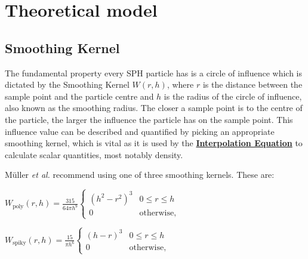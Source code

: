 \documentclass[write-up.tex]{subfiles}
\begin{document}
\section{Theoretical model}
\subsection{Smoothing Kernel}

The fundamental property every SPH particle has is a circle of influence which is dictated by the Smoothing Kernel $W(r, h)$, where $r$ is the distance between the sample point and the particle centre and $h$ is the radius of the circle of influence, also known as the smoothing radius. The closer a sample point is to the centre of the particle, the larger the influence the particle has on the sample point. This influence value can be described and quantified by picking an appropriate smoothing kernel, which is vital as it is used by the \hyperlink{Interpolation Equation}{\textbf{Interpolation Equation}} to calculate scalar quantities, most notably density.

Müller \textit{et al.}\cite{muller} recommend using one of three smoothing kernels. These are:

\begin{center}
$
    W_{\text{poly}}(r, h) = \displaystyle \frac{315}{64 \pi h^9}
    \begin{cases}
        (h^2-r^2)^3 & 0 \leq r \leq h \\
        0 & \text{otherwise},
    \end{cases}
$
\end{center}


\begin{center}
$
    W_{\text{spiky}}(r, h) = \displaystyle \frac{15}{\pi h^6}
    \begin{cases}
        (h-r)^3 & 0 \leq r \leq h \\
        0 & \text{otherwise},
    \end{cases}
$
\end{center}
\end{document}
